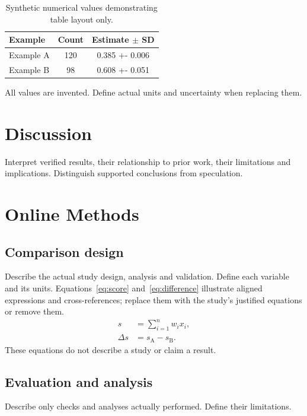 \documentclass[11pt]{article}
\begin{document}
\begin{table}[htbp]
\centering\small
\caption{Synthetic numerical values demonstrating table layout only.}
\label{tab:comparison}
\begin{tabularx}{\linewidth}{@{}>{\raggedright\arraybackslash}X
 S[table-format=3.0] S[table-format=1.3(3)]@{}}
\toprule
Example & {Count} & {Estimate $\pm$ SD}\\
\midrule
Example A & 120 & 0.385 +- 0.006\\
Example B & 98 & 0.608 +- 0.051\\
\bottomrule
\end{tabularx}
\par\smallskip\footnotesize\raggedright
All values are invented. Define actual units and uncertainty when replacing them.
\end{table}

\section{Discussion}\label{sec:discussion}
Interpret verified results, their relationship to prior work, their limitations
and implications. Distinguish supported conclusions from speculation.

\section{Online Methods}\label{sec:methods}
\subsection{Comparison design}
Describe the actual study design, analysis and validation. Define each variable and its units. Equations~\eqref{eq:score}
and~\eqref{eq:difference} illustrate aligned expressions and cross-references;
replace them with the study's justified equations or remove them.
\begin{align}
 s &= \sum_{i=1}^{n} w_i x_i,\label{eq:score}\\
 \Delta s &= s_{\mathrm{A}}-s_{\mathrm{B}}.\label{eq:difference}
\end{align}
These equations do not describe a study or claim a result.

\subsection{Evaluation and analysis}
Describe only checks and analyses actually performed. Define their limitations.
\end{document}
